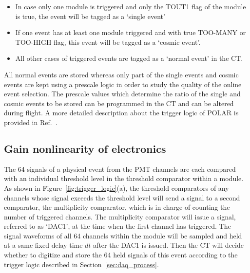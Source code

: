 \documentclass[preprint,sort&compress,12pt]{elsarticle}
\begin{document}
\begin{itemize}
\item In case only one module is triggered and only the TOUT1 flag of the module is true, the event will be tagged as a `single event'
\item If one event has at least one module triggered and with true TOO-MANY or TOO-HIGH flag, this event will be tagged as a `cosmic event'. 
\item All other cases of triggered events are tagged as a `normal event' in the CT. 
\end{itemize}

All normal events are stored whereas only part of the single events and cosmic events are kept using a prescale logic in order to study the quality of the online event selection. The prescale values which determine the ratio of the single and cosmic events to be stored can be programmed in the CT and can be altered during flight. A more detailed description about the trigger logic of POLAR is provided in Ref.~\cite{Rybka}.

\subsection{Gain nonlinearity of electronics}\label{sec:non_linear}

The 64 signals of a physical event from the PMT channels are each compared with an individual threshold level in the threshold comparator within a module. As shown in Figure~\ref{fig:trigger_logic}(a), the threshold comparators of any channels whose signal exceeds the threshold level will send a signal to a second comparator, the multiplicity comparator, which is in charge of counting the number of triggered channels. The multiplicity comparator will issue a signal, referred to as `DAC1', at the time when the first channel has triggered. The signal waveforms of all 64 channels within the module will be sampled and held at a same fixed delay time $dt$ after the DAC1 is issued. Then the CT will decide whether to digitize and store the 64 held signals of this event according to the trigger logic described in Section~\ref{sec:daq_process}. 
\end{document}
